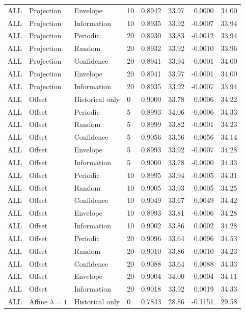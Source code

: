 \begin{longtable}{llllrrrr}
ALL & Projection & Envelope & 10 & 0.8942 & 33.97 & 0.0000 & 34.00 \\
ALL & Projection & Information & 10 & 0.8935 & 33.92 & -0.0007 & 33.94 \\
ALL & Projection & Periodic & 20 & 0.8930 & 33.83 & -0.0012 & 33.94 \\
ALL & Projection & Random & 20 & 0.8932 & 33.92 & -0.0010 & 33.96 \\
ALL & Projection & Confidence & 20 & 0.8941 & 33.94 & -0.0001 & 34.00 \\
ALL & Projection & Envelope & 20 & 0.8941 & 33.97 & -0.0001 & 34.00 \\
ALL & Projection & Information & 20 & 0.8935 & 33.92 & -0.0007 & 33.94 \\
ALL & Offset & Historical only & 0 & 0.9000 & 33.78 & 0.0006 & 34.22 \\
ALL & Offset & Periodic & 5 & 0.8993 & 34.06 & -0.0006 & 34.33 \\
ALL & Offset & Random & 5 & 0.8999 & 33.82 & -0.0001 & 34.23 \\
ALL & Offset & Confidence & 5 & 0.9056 & 33.56 & 0.0056 & 34.14 \\
ALL & Offset & Envelope & 5 & 0.8993 & 33.92 & -0.0007 & 34.28 \\
ALL & Offset & Information & 5 & 0.9000 & 33.78 & -0.0000 & 34.33 \\
ALL & Offset & Periodic & 10 & 0.8995 & 33.94 & -0.0005 & 34.31 \\
ALL & Offset & Random & 10 & 0.9005 & 33.93 & 0.0005 & 34.25 \\
ALL & Offset & Confidence & 10 & 0.9049 & 33.67 & 0.0049 & 34.42 \\
ALL & Offset & Envelope & 10 & 0.8993 & 33.81 & -0.0006 & 34.28 \\
ALL & Offset & Information & 10 & 0.9002 & 33.86 & 0.0002 & 34.28 \\
ALL & Offset & Periodic & 20 & 0.9096 & 33.64 & 0.0096 & 34.53 \\
ALL & Offset & Random & 20 & 0.9010 & 33.86 & 0.0010 & 34.23 \\
ALL & Offset & Confidence & 20 & 0.9088 & 33.64 & 0.0088 & 34.33 \\
ALL & Offset & Envelope & 20 & 0.9004 & 34.00 & 0.0004 & 34.11 \\
ALL & Offset & Information & 20 & 0.9018 & 33.92 & 0.0019 & 34.33 \\
ALL & Affine $\lambda=1$ & Historical only & 0 & 0.7843 & 28.86 & -0.1151 & 29.58 \\

\end{longtable}
